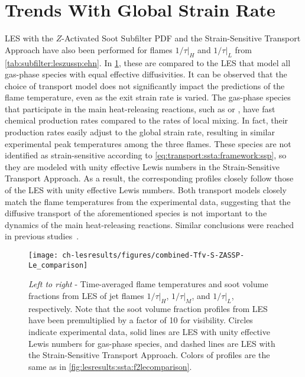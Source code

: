 \section{Trends With Global Strain Rate}
\label{sec:lesresults:strain}

LES with the $Z$-Activated Soot Subfilter PDF and the Strain-Sensitive Transport Approach have also been performed for flames $1/\tau|_H$ and $1/\tau|_L$ from \cref{tab:subfilter:leszussp:ehn}. In \cref{fig:lesresults:strain:allflameslecomparison}, these are compared to the LES that model all gas-phase species with equal effective diffusivities. It can be observed that the choice of transport model does not significantly impact the predictions of the flame temperature, even as the exit strain rate is varied. The gas-phase species that participate in the main heat-releasing reactions, such as  or , have fast chemical production rates compared to the rates of local mixing. In fact, their production rates easily adjust to the global strain rate, resulting in similar experimental peak temperatures among the three flames. These species are not identified as strain-sensitive according to \cref{eq:transport:ssta:framework:ssp}, so they are modeled with unity effective Lewis numbers in the Strain-Sensitive Transport Approach. As a result, the corresponding profiles closely follow those of the LES with unity effective Lewis numbers. Both transport models closely match the flame temperatures from the experimental data, suggesting that the diffusive transport of the aforementioned species is not important to the dynamics of the main heat-releasing reactions. Similar conclusions were reached in previous studies~\cite{attili2015,attili2016}.

\begin{figure}[htb]
  \centering
  \texttt{[image: ch-lesresults/figures/combined-Tfv-S-ZASSP-Le\_comparison]}
  \caption[Centerline $\langle T \rangle$ \& $\langle f_V \rangle$ from LES of Flames $1/\tau|_H$, $1/\tau|_M$, and $1/\tau|_L$ with Various Transport Approaches]{\textit{Left to right} - Time-averaged flame temperatures and soot volume fractions from LES of jet flames $1/\tau|_H$, $1/\tau|_M$, and $1/\tau|_L$, respectively. Note that the soot volume fraction profiles from LES have been premultiplied by a factor of 10 for visibility. Circles indicate experimental data, solid lines are LES with unity effective Lewis numbers for gas-phase species, and dashed lines are LES with the Strain-Sensitive Transport Approach. Colors of profiles are the same as in \cref{fig:lesresults:ssta:f2lecomparison}.}
  \label{fig:lesresults:strain:allflameslecomparison}
\end{figure}

